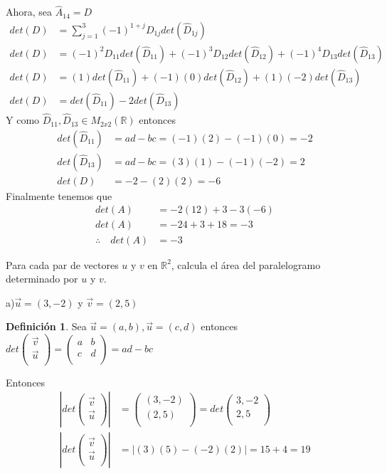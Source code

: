 \documentclass[letterpaper]{article}
\newcommand{\R}{\mathds{R}}
\renewcommand{\*}{\cdot}
\theoremstyle{definition}
\newtheorem{definition}{Definición}
\begin{document}
	Ahora, sea $ \hat{A}_{14} = D $
	\begin{align*}
		det(D) &= \sum_{j = 1}^{3}(-1)^{1+j} D_{1j} det(\hat{D}_{1j})\\
		det(D) &= (-1)^2 D_{11} det(\hat{D}_{11}) + (-1)^3 D_{12} det(\hat{D}_{12}) + (-1)^4 D_{13} det(\hat{D}_{13})  \\
		det(D) &= (1)det(\hat{D}_{11}) + (-1)(0)det(\hat{D}_{12}) + (1)(-2) det(\hat{D}_{13})  \\
		det(D) &= det(\hat{D}_{11}) -2 det(\hat{D}_{13})  
	\end{align*}
	Y como $ \hat{D}_{11}, \hat{D}_{13} \in M_{2x2}(\R) $ entonces
	\begin{align*}
		det(\hat{D}_{11}) &= ad -bc = (-1)(2)-(-1)(0) = -2\\
		det(\hat{D}_{13}) &= ad -bc = (3)(1)-(-1)(-2) = 2\\
		det(D) &= -2-(2)(2) = -6
	\end{align*}
	Finalmente tenemos que
	\begin{align*}
		det(A) &= -2(12) + 3 -3(-6)\\
		det(A) &= -24 + 3 + 18 = -3\\
		\therefore \quad det(A) &= -3
	\end{align*}
	\begin{ejercicio}{15}
		Para cada par de vectores $u$ y $v$ en $\mathbb{R}^2$, calcula el área del paralelogramo determinado por $u$ y $v$.
	\end{ejercicio}
	\noindent a)$\vec{u} = (3,-2)$ y $\vec{v} = (2,5)$\\
	\begin{definition}
		Sea $ \vec{u} = (a,b), \vec{u} =(c,d) $ entonces $ det\begin{pmatrix}
		\vec{v}\\
		\vec{u}\\
		\end{pmatrix}  = \begin{pmatrix}
		a & b\\
		c & d\\
		\end{pmatrix} = ad-bc$ 	
	\end{definition}
	Entonces 
	\begin{align*}
		\left|det\begin{pmatrix}
		\vec{v}\\
		\vec{u}\\
		\end{pmatrix} \right|& = \begin{pmatrix}
		(3,-2)\\
		(2,5)\\
		\end{pmatrix} = det\begin{pmatrix}
		3,-2\\
		2,5\\
		\end{pmatrix}\\
		\left|det\begin{pmatrix}
		\vec{v}\\
		\vec{u}\\
		\end{pmatrix} \right|& = |(3)(5)-(-2)(2)| = 15+4 = 19
	\end{align*}
\end{document}

